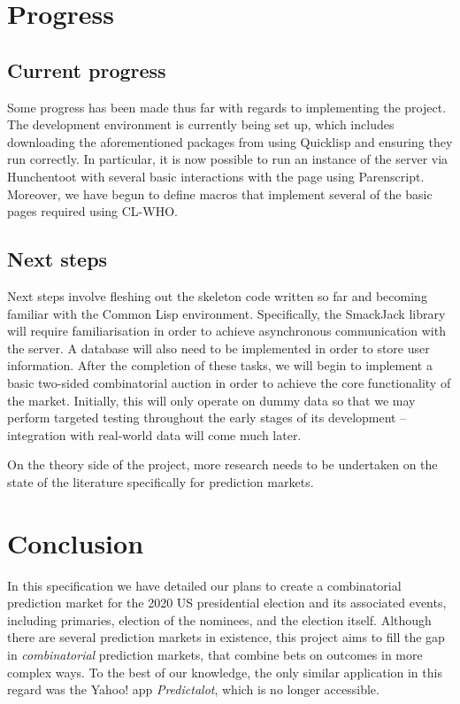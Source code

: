 \documentclass[10pt,a4paper]{article}
\theoremstyle{plain}
\theoremstyle{definition}
\begin{document}
\section{Progress}
	\label{sec:progress}

	\subsection{Current progress}

	Some progress has been made thus far with regards to implementing the
	project. The development environment is currently being set up, which
	includes downloading the aforementioned packages from using Quicklisp and
	ensuring they run correctly. In particular, it is now possible to run an
	instance of the server via Hunchentoot with several basic interactions with
	the page using Parenscript. Moreover, we have begun to define macros that
	implement several of the basic pages required using CL-WHO.

	\subsection{Next steps}

	Next steps involve fleshing out the skeleton code written so far and
	becoming familiar with the Common Lisp environment. Specifically, the
	SmackJack library will require familiarisation in order to achieve
	asynchronous communication with the server. A database will also need to be
	implemented in order to store user information. After the completion of
	these tasks, we will begin to implement a basic two-sided combinatorial
	auction in order to achieve the core functionality of the market.
	Initially, this will only operate on dummy data so that we may perform
	targeted testing throughout the early stages of its development --
	integration with real-world data will come much later.

	On the theory side of the project, more research needs to be undertaken on
	the state of the literature specifically for prediction markets.

\section{Conclusion}
	\label{sec:conclusion}

	In this specification we have detailed our plans to create a combinatorial
	prediction market for the 2020 US presidential election and its associated
	events, including primaries, election of the nominees, and the election
	itself. Although there are several prediction markets in existence, this
	project aims to fill the gap in \emph{combinatorial} prediction markets,
	that combine bets on outcomes in more complex ways. To the best of our
	knowledge, the only similar application in this regard was the Yahoo! app
	\emph{Predictalot}, which is no longer accessible.
\end{document}
